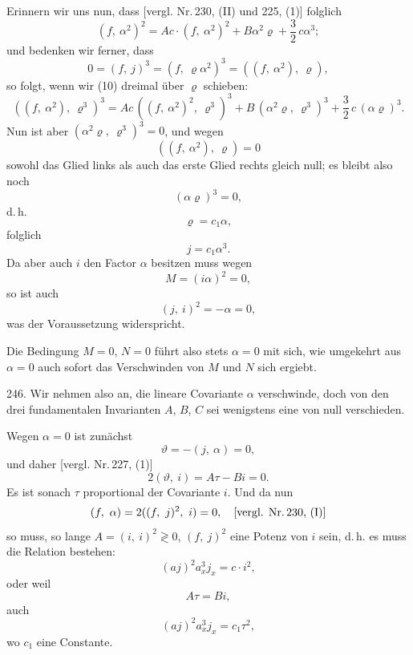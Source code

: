 Erinnern wir uns nun, dass [vergl. Nr.\,230, (II) und 225, (1)]
folglich
\[
(f,\ \alpha^2)^2 = Ac\cdot(f,\ \alpha^2)^2 + B\alpha^2\varrho + \frac{3}{2}\,c\alpha^3;
\]
und bedenken wir ferner, dass
\[
0 = (f,\ j)^3 = (f,\ \varrho\alpha^2)^3 = ((f,\ \alpha^2),\ \varrho),
\]
so folgt, wenn wir (10) dreimal \"uber $\varrho$ schieben:
\[
((f,\ \alpha^2),\ \varrho^3)^3 = Ac\,((f,\ \alpha^2)^2,\ \varrho^3)^3 + B\,(\alpha^2\varrho,\ \varrho^3)^3 + \frac{3}{2}\,c\,(\alpha\varrho)^3.
\]
Nun ist aber $(\alpha^2\varrho,\ \varrho^3)^3 = 0$, und wegen
\[
((f,\ \alpha^2),\ \varrho) = 0
\]
sowohl das Glied links als auch das erste Glied rechts gleich null; es bleibt also noch
\[
(\alpha\varrho)^3 = 0,
\]
d.\,h.
\[
\varrho = c_1\alpha,
\]
folglich
\[
j = c_1\alpha^3.
\]
Da aber auch $i$ den Factor $\alpha$ besitzen muss wegen
\[
M = (i\alpha)^2 = 0,
\]
so ist auch
\[
(j,\ i)^2 = -\alpha = 0,
\]
was der Voraussetzung widerspricht.

Die Bedingung $M=0$, $N=0$ f\"uhrt also stets $\alpha=0$ mit sich, wie umgekehrt aus $\alpha=0$ auch sofort das Verschwinden von $M$ und $N$ sich ergiebt.


246. Wir nehmen also an, die lineare Covariante $\alpha$ verschwinde, doch von den drei fundamentalen Invarianten $A$, $B$, $C$ sei wenigstens eine von null verschieden.

Wegen $\alpha=0$ ist zun\"achst
\[
\vartheta = -(j,\ \alpha) = 0,
\]
und daher [vergl. Nr.\,227, (1)]
\[
2(\vartheta,\ i) = A\tau - Bi = 0.
\]
Es ist sonach $\tau$ proportional der Covariante $i$. Und da nun
\[
(f,\ \alpha) = 2((f,\ j)^2,\ i) = 0, \quad \text{[vergl. Nr.\,230, (I)]}
\]
so muss, so lange $A=(i,\ i)^2\gtrless 0$, $(f,\ j)^2$ eine Potenz von $i$ sein, d.\,h. es muss die Relation bestehen:
\[
(aj)^2 a_x^3 j_x = c\cdot i^2,
\]
oder weil
\[
A\tau = Bi,
\]
auch
\[
(aj)^2 a_x^3 j_x = c_1\tau^2,
\]
wo $c_1$ eine Constante.

